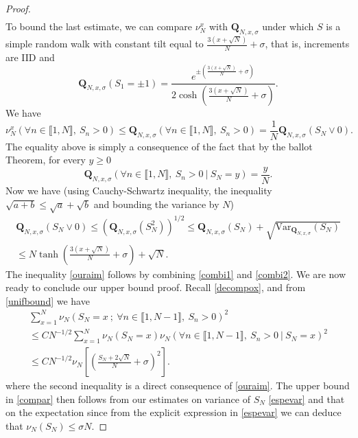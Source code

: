 \documentclass[reqno,11pt]{amsart}
\numberwithin{equation}{section}
\newcommand{\gs}{\sigma}
\newcommand{\bQ}{{\ensuremath{\mathbf Q}} }
\newcommand{\lint}{\llbracket}
\newcommand{\rint}{\rrbracket}
\newcommand{\Var}{\mathrm{Var}}
\begin{document}
\begin{proof}
\begin{multline}
\end{multline}
To bound the last estimate, we can compare $\nu^x_{N}$ with $\bQ_{N,x,\sigma}$ under which $S$ is a simple random walk with constant tilt equal to $\frac{3 (x+\sqrt{N})}{N}+ \gs$, that is, increments are IID and $$\bQ_{N,x,\sigma}(S_1=\pm 1)= \frac{e^{\pm\left(\frac{3 (x+\sqrt{N})}{N}+ \gs\right)}}{2\cosh\left( \frac{3 (x+\sqrt{N})}{N}+ \gs\right)}.$$
We have 
\begin{equation}\label{combi2}
 \nu^x_{N}\left(   \forall n\in \lint 1,N\rint, \ S_{n} >0 \right)\le
 \bQ_{N,x,\sigma}\left( \forall n\in \lint 1,N\rint , \ S_{n} >0\right)=\frac{1}{N} \bQ_{N,x,\sigma}(S_N\vee 0).
\end{equation}
The equality above is simply a consequence of the fact that by the ballot Theorem, for every $y\ge 0$
$$ \bQ_{N,x,\sigma}\left( \forall n\in \lint 1,N\rint , \ S_{n} >0  \ | \ S_N=y\right)=\frac{y}{N}.$$
 Now we have (using Cauchy-Schwartz inequality, the inequality $\sqrt{a+b}\le \sqrt{a}+\sqrt{b}$ and bounding the variance by $N$) 
\begin{multline}
 \bQ_{N,x,\sigma}(S_N\vee 0)\le \left( \bQ_{N,x,\sigma}(S^2_N) \right)^{1/2}\le \bQ_{N,x,\sigma}(S_N)
 + \sqrt{ \Var_{ \bQ_{N,x,\sigma}}(S_N)}\\ \le N\tanh\left(\frac{3 (x+\sqrt{N})}{N}+ \gs\right)+\sqrt{N}.
 \end{multline}
The inequality \eqref{ouraim} follows by combining \eqref{combi1} and \eqref{combi2}.
We are now ready to conclude our upper bound proof. Recall \eqref{decompox}, and
from \eqref{unifbound} we have 
\begin{multline}
 \sum_{x=1}^N   \nu_{N}\left( S_N=x \ ; \  \forall n\in \lint 1,N-1\rint, \ S_{n} >0 \right)^2\\
 \le   C N^{-1/2} \sum_{x=1}^N \nu_{N}\left( S_N=x\right)  \nu_{N}\left( \forall n\in \lint 1,N-1\rint, \ S_{n} >0 \ | \ S_N=x \right)^2\\
 \le C N^{-1/2} \nu_N \left[  \left(\frac{S_N  + 2 \sqrt{N}}{N}+\sigma\right)^2 \right].
\end{multline}
where the second inequality is a direct consequence of \eqref{ouraim}. The upper bound in
\eqref{compar} then follows from our estimates on variance of $S_N$ \eqref{espevar}  and that on the expectation  since from the explicit expression in \eqref{espevar} we can deduce that $\nu_N(S_N) \le \gs N .$

\end{proof}
\end{document}
